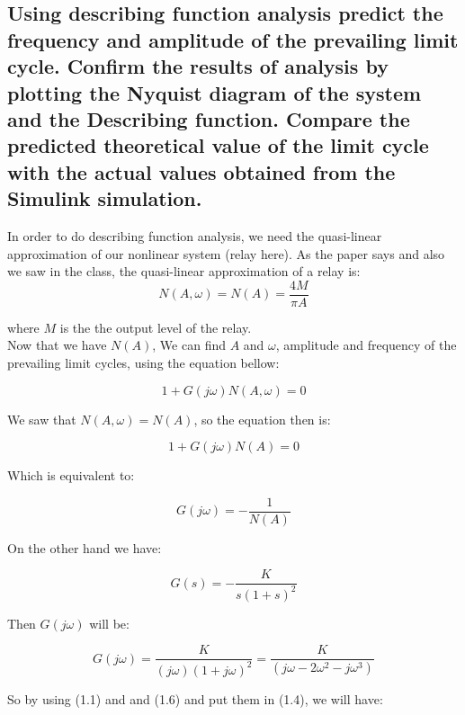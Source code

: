 \documentclass[11pt]{scrartcl} %
\begin{document}
\subsection{Using describing function analysis predict the frequency and amplitude of the prevailing limit cycle. Conﬁrm the results of analysis by plotting the Nyquist diagram of the system and the Describing function. Compare the predicted theoretical value of the limit cycle with the actual values obtained from the Simulink simulation.}

In order to do describing function analysis, we need the quasi-linear approximation of our nonlinear system (relay here). As the paper says and also we saw in the class, the quasi-linear approximation of a relay is:
\begin{equation}
    N(A,\omega) = N(A) = \frac{4M}{\pi A}
\end{equation}

where $M$ is the the output level of the relay.\\

Now that we have $N(A)$, We can find $A$ and $\omega$, amplitude and frequency of the prevailing limit
cycles, using the equation bellow:

\begin{equation}
    1 + G(j\omega)N(A,\omega) = 0
\end{equation}

We saw that $N(A,\omega) = N(A)$, so the equation then is:

\begin{equation}
    1 + G(j\omega)N(A) = 0
\end{equation}

Which is equivalent to:

\begin{equation}
    G(j\omega) = - \frac{1}{N(A)}
\end{equation}

On the other hand we have:

\begin{equation}
    G(s) = - \frac{K}{s(1+s)^2}
\end{equation}

Then $G(j\omega)$ will be:

\begin{equation}
    G(j\omega) = \frac{K}{(j\omega)(1+j\omega)^2} = \frac{K}{(j\omega - 2\omega ^2 - j\omega ^3)}
\end{equation}

So by using (1.1) and and (1.6) and put them in (1.4), we will have:
\end{document}
